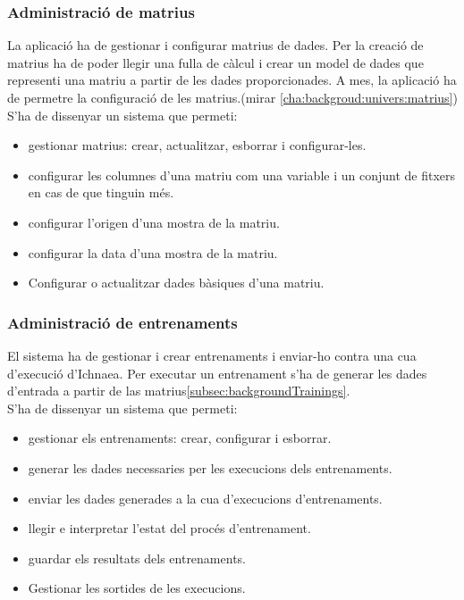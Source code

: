 \subsubsection{Administraci\'{o} de matrius}
La aplicaci\'{o} ha de gestionar i configurar matrius de dades. Per la creaci\'{o} de matrius ha de poder llegir una fulla de c\`{a}lcul i crear un model de dades que representi una matriu a partir de les dades proporcionades. A mes, la aplicaci\'{o} ha de permetre la configuraci\'{o} de les matrius.(mirar \ref{cha:backgroud:univers:matrius})\\

S'ha de dissenyar un sistema que permeti:
\begin{itemize}
\item gestionar matrius: crear, actualitzar, esborrar i configurar-les.
\item configurar les columnes d'una matriu com una variable i un conjunt de fitxers en cas de que tinguin m\'{e}s.
\item configurar l'origen d'una mostra de la matriu.
\item configurar la data d'una mostra de la matriu.
\item Configurar o actualitzar dades b\`{a}siques d'una matriu.
\end{itemize}

\subsubsection{Administraci\'{o} de entrenaments}
El sistema ha de gestionar i crear entrenaments i enviar-ho contra una cua d'execuci\'{o} d'Ichnaea. Per executar un entrenament s'ha de generar les dades d'entrada a partir de las matrius\ref{subsec:backgroundTrainings}.\\

S'ha de dissenyar un sistema que permeti:
\begin{itemize}
	\item gestionar els entrenaments: crear, configurar i esborrar.
	\item generar les dades necessaries per les execucions dels entrenaments.
	\item enviar les dades generades a la cua d'execucions d'entrenaments.
	\item llegir e interpretar l'estat del proc\'{e}s d'entrenament.
	\item guardar els resultats dels entrenaments.
	\item Gestionar les sortides de les execucions.
\end{itemize}

